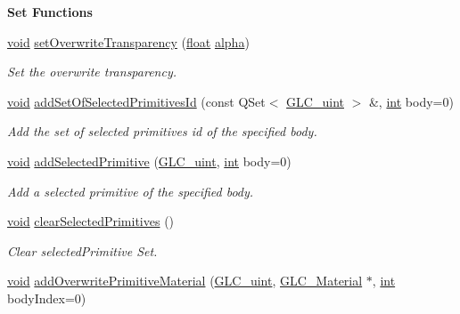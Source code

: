 \begin{Indent}{\bf Set Functions}
\begin{DoxyCompactItemize}
\hyperlink{group___u_a_v_objects_plugin_ga444cf2ff3f0ecbe028adce838d373f5c}{void} \hyperlink{class_g_l_c___render_properties_a68221cf68bd7bc6eab5b1c6b294a003f}{set\-Overwrite\-Transparency} (\hyperlink{_super_l_u_support_8h_a6a1bb6ed41f44b60e7bd83b0e9945aa7}{float} \hyperlink{glext_8h_a55d98ec4b6aa35ace9b91275e7ad847b}{alpha})
\begin{DoxyCompactList}\small\item\em Set the overwrite transparency. \end{DoxyCompactList}\item 
\hyperlink{group___u_a_v_objects_plugin_ga444cf2ff3f0ecbe028adce838d373f5c}{void} \hyperlink{class_g_l_c___render_properties_ad4fa9e349e676b01e1a886c00fb17e63}{add\-Set\-Of\-Selected\-Primitives\-Id} (const Q\-Set$<$ \hyperlink{glc__global_8h_abf950976fabed69026558df8e2da6c6b}{G\-L\-C\-\_\-uint} $>$ \&, \hyperlink{ioapi_8h_a787fa3cf048117ba7123753c1e74fcd6}{int} body=0)
\begin{DoxyCompactList}\small\item\em Add the set of selected primitives id of the specified body. \end{DoxyCompactList}\item 
\hyperlink{group___u_a_v_objects_plugin_ga444cf2ff3f0ecbe028adce838d373f5c}{void} \hyperlink{class_g_l_c___render_properties_ab5df7e96baa499d119c73464c3a0b95e}{add\-Selected\-Primitive} (\hyperlink{glc__global_8h_abf950976fabed69026558df8e2da6c6b}{G\-L\-C\-\_\-uint}, \hyperlink{ioapi_8h_a787fa3cf048117ba7123753c1e74fcd6}{int} body=0)
\begin{DoxyCompactList}\small\item\em Add a selected primitive of the specified body. \end{DoxyCompactList}\item 
\hyperlink{group___u_a_v_objects_plugin_ga444cf2ff3f0ecbe028adce838d373f5c}{void} \hyperlink{class_g_l_c___render_properties_a447546b0b7980aca8fadf2d33330964e}{clear\-Selected\-Primitives} ()
\begin{DoxyCompactList}\small\item\em Clear selected\-Primitive Set. \end{DoxyCompactList}\item 
\hyperlink{group___u_a_v_objects_plugin_ga444cf2ff3f0ecbe028adce838d373f5c}{void} \hyperlink{class_g_l_c___render_properties_a4434dcbbd2df31afa9fc621389d7f7b5}{add\-Overwrite\-Primitive\-Material} (\hyperlink{glc__global_8h_abf950976fabed69026558df8e2da6c6b}{G\-L\-C\-\_\-uint}, \hyperlink{class_g_l_c___material}{G\-L\-C\-\_\-\-Material} $\ast$, \hyperlink{ioapi_8h_a787fa3cf048117ba7123753c1e74fcd6}{int} body\-Index=0)

\end{DoxyCompactItemize}
\end{Indent}
